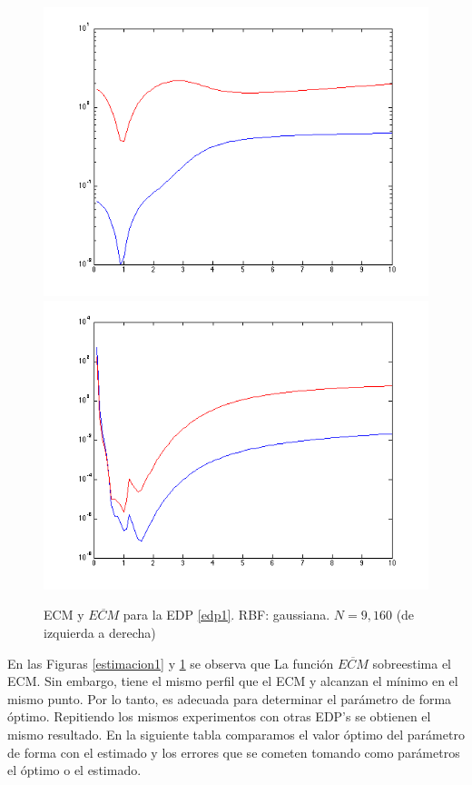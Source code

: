 \documentclass[11pt,a4paper]{article}
\begin{document}
\begin{figure}[H]
\includegraphics[scale=.45]{est_1_9_gauss.png}
\includegraphics[scale=.45]{est_1_169_gauss.png}
\caption{ECM y $\overline{ECM}$ para la EDP \ref{edp1}. RBF: gaussiana. $N=9,160$ (de izquierda a derecha)}
\label{estimacion2}
\end{figure}
En las Figuras \ref{estimacion1} y \ref{estimacion2} se observa que La función $\overline{ECM}$ sobreestima el ECM. Sin embargo, tiene el mismo perfil que el ECM y alcanzan el mínimo en el mismo punto. Por lo tanto, es adecuada para determinar el parámetro de forma óptimo. Repitiendo los mismos experimentos con otras EDP's se obtienen el mismo resultado. En la siguiente tabla comparamos el valor óptimo del parámetro de forma con el estimado y los errores que se cometen tomando como parámetros el óptimo o el estimado. 
\end{document}
